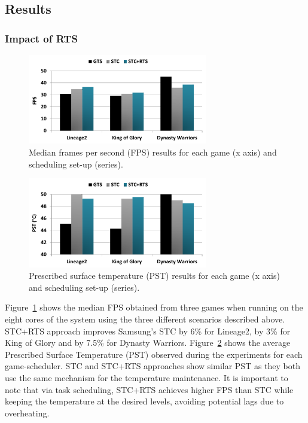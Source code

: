 \subsection{Results}
\subsubsection{Impact of RTS}
\begin{figure}[t]%
	\centering
	\includegraphics[width=0.7\textwidth]{figures/FPS.pdf}
	\caption{Median frames per second (FPS) results for each game (x axis) and scheduling set-up (series).}
	\label{fig:FPS}
\end{figure}

\begin{figure}[h]%
	\centering
	\includegraphics[width=0.7\textwidth]{figures/PST.pdf}
	\caption{Prescribed surface temperature (PST) results for each game (x axis) and scheduling set-up (series).}
	\label{fig:PST}
\end{figure}

Figure~\ref{fig:FPS} shows the median FPS obtained from three games when running on the eight cores of the system using the three different scenarios described above. 
STC+RTS approach improves Samsung's STC by 6\% for Lineage2, by 3\% for King of Glory and by 7.5\% for Dynasty Warriors. 
Figure~\ref{fig:PST} shows the average Prescribed Surface Temperature (PST) observed during the experiments for each game-scheduler.
STC and STC+RTS approaches show similar PST as they both use the same mechanism for the temperature maintenance.
It is important to note that via task scheduling, STC+RTS achieves higher FPS than STC while keeping the temperature at the desired levels, avoiding potential lags due to overheating.

